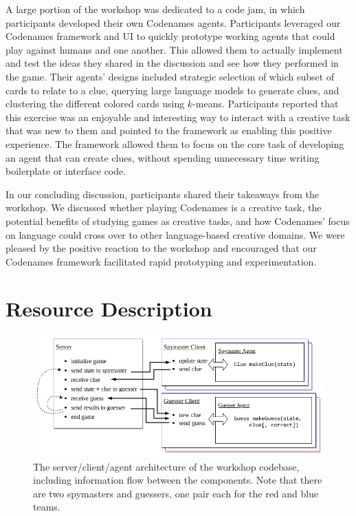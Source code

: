 \documentclass[phd,electronic,oneside,twosidetoc,letterpaper,chaptercenter,parttop,lof]{byumsphd}
\begin{document}
A large portion of the workshop was dedicated to a code jam, in which participants developed their own Codenames agents. Participants leveraged our Codenames framework and UI to quickly prototype working agents that could play against humans and one another. This allowed them to actually implement and test the ideas they shared in the discussion and see how they performed in the game. Their agents’ designs included strategic selection of which subset of cards to relate to a clue, querying large language models to generate clues, and clustering the different colored cards using $k$-means. Participants reported that this exercise was an enjoyable and interesting way to interact with a creative task that was new to them and pointed to the framework as enabling this positive experience. The framework allowed them to focus on the core task of developing an agent that can create clues, without spending unnecessary time writing boilerplate or interface code.

In our concluding discussion, participants shared their takeaways from the workshop. We discussed whether playing Codenames is a creative task, the potential benefits of studying games as creative tasks, and how Codenames’ focus on language could cross over to other language-based creative domains. We were pleased by the positive reaction to the workshop and encouraged that our Codenames framework facilitated rapid prototyping and experimentation.


\section{Resource Description}

\begin{figure}[t!]
    \centering
    \includegraphics[width=.95\textwidth]{images/codenames/server-client.png}
    \caption[Server-client architecture]{The server/client/agent architecture of the workshop codebase, including information flow between the components. Note that there are two spymasters and guessers, one
pair each for the red and blue teams.}
    \label{fig:server-client-architecture}
\end{figure}
\end{document}

